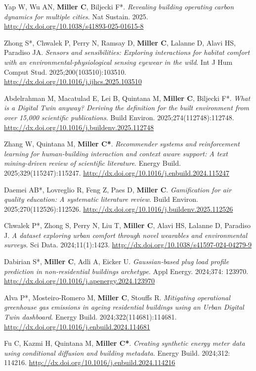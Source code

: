 \documentclass[10pt,a4paper]{article}
\begin{document}
\begin{small}
\begin{etaremune}
\item
Yap W, Wu AN, \textbf{Miller C}, Biljecki F*. \emph{Revealing building operating carbon dynamics for multiple cities}. Nat Sustain. 2025. \url{http://dx.doi.org/10.1038/s41893-025-01615-8}
\item
Zhong S*, Chwalek P, Perry N, Ramsay D, \textbf{Miller C}, Lalanne D, Alavi HS, Paradiso JA. \emph{Sensors and sensibilities: Exploring interactions for habitat comfort with an environmental-physiological sensing eyewear in the wild}. Int J Hum Comput Stud. 2025;200(103510):103510. \url{http://dx.doi.org/10.1016/j.ijhcs.2025.103510}
\item
Abdelrahman M, Macatulad E, Lei B, Quintana M, \textbf{Miller C}, Biljecki F*. \emph{What is a Digital Twin anyway? Deriving the definition for the built environment from over 15,000 scientific publications}. Build Environ. 2025;274(112748):112748. \url{http://dx.doi.org/10.1016/j.buildenv.2025.112748}
\item
Zhang W, Quintana M, \textbf{Miller C*}. \emph{Recommender systems and reinforcement learning for human-building interaction and context aware support: A text mining-driven review of scientific literature}. Energy Build. 2025;329(115247):115247. \url{http://dx.doi.org/10.1016/j.enbuild.2024.115247}
\item
Daemei AB*, Lovreglio R, Feng Z, Paes D, \textbf{Miller C}. \emph{Gamification for air quality education: A systematic literature review}. Build Environ. 2025;270(112526):112526. \url{http://dx.doi.org/10.1016/j.buildenv.2025.112526}
\item
Chwalek P*, Zhong S, Perry N, Liu T, \textbf{Miller C}, Alavi HS, Lalanne D, Paradiso J. \emph{A dataset exploring urban comfort through novel wearables and environmental surveys}. Sci Data. 2024;11(1):1423. \url{http://dx.doi.org/10.1038/s41597-024-04279-9}
\item
Dabirian S*, \textbf{Miller C}, Adli A, Eicker U. \emph{Gaussian-based plug load profile prediction in non-residential buildings archetype}. Appl Energy. 2024;374: 123970. \url{http://dx.doi.org/10.1016/j.apenergy.2024.123970}
\item
Alva P*, Mosteiro-Romero M, \textbf{Miller C}, Stouffs R. \emph{Mitigating operational greenhouse gas emissions in ageing residential buildings using an Urban Digital Twin dashboard}. Energy Build. 2024;322(114681):114681. \url{http://dx.doi.org/10.1016/j.enbuild.2024.114681}
\item
Fu C, Kazmi H, Quintana M, \textbf{Miller C*}. \emph{Creating synthetic energy meter data using conditional diffusion and building metadata}. Energy Build. 2024;312: 114216. \url{http://dx.doi.org/10.1016/j.enbuild.2024.114216}

\end{etaremune}
\end{small}
\end{document}

